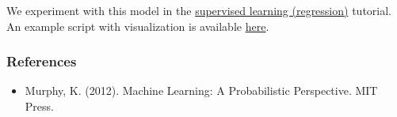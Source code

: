 We experiment with this model in the \href{tut_supervised_regression.html}{supervised
learning (regression)} tutorial.
An example script with visualization is available
\href{https://github.com/blei-lab/edward/blob/master/examples/bayesian_linear_regression_plot.py}
{here}.

\subsubsection{References}\label{references}

\begin{itemize}
\item
  Murphy, K. (2012). Machine Learning: A Probabilistic Perspective. MIT Press.
\end{itemize}
